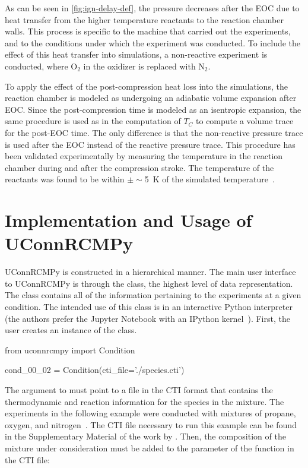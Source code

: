 \documentclass[12pt]{../ussci}
\begin{document}
As can be seen in \cref{fig:ign-delay-def}, the pressure
decreases after the EOC due to heat transfer from the higher temperature
reactants to the reaction chamber walls. This process is specific to the
machine that carried out the experiments, and to the conditions under
which the experiment was conducted. To include the effect of this heat
transfer into simulations, a non-reactive experiment is conducted, where
\(\text{O}_2\) in the oxidizer is replaced with \(\text{N}_2\).

To apply the effect of the post-compression heat loss into the simulations, the
reaction chamber is modeled as undergoing an adiabatic volume expansion after
EOC. Since the post-compression time is modeled as an isentropic expansion, the
same procedure is used as in the computation of \(T_C\) to compute a volume
trace for the post-EOC time. The only difference is that the non-reactive
pressure trace is used after the EOC instead of the reactive pressure trace.
This procedure has been validated experimentally by measuring the temperature in
the reaction chamber during and after the compression stroke. The temperature of
the reactants was found to be within $\pm\sim $\SI{5}{\K} of the simulated
temperature~\autocite{Das2012a,Uddi2012}.

\section{Implementation and Usage of UConnRCMPy}\label{implementation-and-usage-of-uconnrcmpy}

UConnRCMPy is constructed in a hierarchical manner. The main user interface to
UConnRCMPy is through the  class, the highest level of data
representation. The  class contains all of the information
pertaining to the experiments at a given condition. The intended use of this
class is in an interactive Python interpreter (the authors prefer the Jupyter
Notebook with an IPython kernel~\autocite{Perez2007}). First, the user creates
an instance of the  class.

\begin{pythonbox}
from uconnrcmpy import Condition

cond_00_02 = Condition(cti_file='./species.cti')
\end{pythonbox}

The  argument to  must point to a file in the
CTI format that contains the thermodynamic and reaction information for the
species in the mixture. The experiments in the following example were conducted
with mixtures of propane, oxygen, and nitrogen~\autocite{Dames2016}. The CTI
file necessary to run this example can be found in the Supplementary Material of
the work by \textcite{Dames2016}. Then, the composition of the mixture under
consideration must be added to the  parameter of the
 function in the CTI file:
\end{document}

